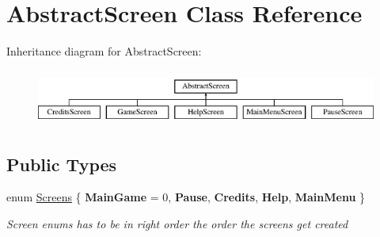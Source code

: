 \hypertarget{class_abstract_screen}{}\section{Abstract\+Screen Class Reference}
\label{class_abstract_screen}
Inheritance diagram for Abstract\+Screen\+:\begin{figure}[H]
\begin{center}
\leavevmode
\includegraphics[height=1.851240cm]{class_abstract_screen}
\end{center}
\end{figure}
\subsection*{Public Types}
\begin{DoxyCompactItemize}
\item 
enum \mbox{\hyperlink{class_abstract_screen_a837c6697225dad22e41a384fde73c16b}{Screens}} \{ \newline
{\bfseries Main\+Game} = 0, 
{\bfseries Pause}, 
{\bfseries Credits}, 
{\bfseries Help}, 
\newline
{\bfseries Main\+Menu}
 \}
\begin{DoxyCompactList}\small\item\em Screen enums has to be in right order the order the screens get created \end{DoxyCompactList}\end{DoxyCompactItemize}
